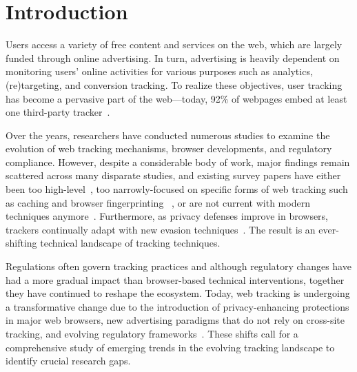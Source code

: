\section{Introduction}
\label{sec:introduction}

Users access a variety of free content and services on the web, which are largely funded through online advertising.
%
In turn, advertising is heavily dependent on monitoring users' online activities for various purposes such as analytics, (re)targeting, and conversion tracking.
%
To realize these objectives, user tracking has become a pervasive part of the web---today, 92\% of webpages embed at least one third-party tracker~\cite{urban2024WebAlmanac2024}.

Over the years, researchers have conducted numerous studies to examine the evolution of web tracking mechanisms, browser developments, and regulatory compliance.
%
However, despite a considerable body of work, major findings remain scattered across many disparate studies, and existing survey papers have either been too high-level~\cite{ermakova2018web}, too narrowly-focused on specific forms of web tracking
such as caching and browser fingerprinting
~\cite{bujlowSurveyWebTracking2017,laperdrix2020browser}, or are not current with modern techniques anymore~\cite{mayerThirdPartyWebTracking2012}.
%
Furthermore, as privacy defenses improve in browsers, trackers continually adapt with new evasion techniques~\cite{narayanan2018web,localmess-usenix-sec-26}.
%
The result is an ever-shifting technical landscape of tracking techniques.

Regulations often govern tracking practices and although regulatory changes have had a more gradual impact than browser-based technical interventions, together they have continued to reshape the ecosystem.
%
Today, web tracking is undergoing a transformative change due to the introduction of privacy-enhancing protections in major web browsers, new advertising paradigms that do not rely on cross-site tracking, and evolving regulatory frameworks~\cite{hercherW3CAdPrivacy2022,chavezUpdatePlansPrivacy2025}.
%
These shifts call for a comprehensive study of emerging trends in the evolving tracking landscape to identify crucial research gaps.

